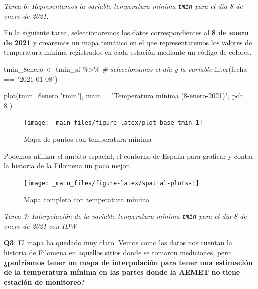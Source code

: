 \documentclass[
]{book}
\newenvironment{Shaded}{\begin{snugshade}}{\end{snugshade}}
\newcommand{\AttributeTok}[1]{\textcolor[rgb]{0.77,0.63,0.00}{#1}}
\newcommand{\CommentTok}[1]{\textcolor[rgb]{0.56,0.35,0.01}{\textit{#1}}}
\newcommand{\DecValTok}[1]{\textcolor[rgb]{0.00,0.00,0.81}{#1}}
\newcommand{\FunctionTok}[1]{\textcolor[rgb]{0.00,0.00,0.00}{#1}}
\newcommand{\NormalTok}[1]{#1}
\newcommand{\OtherTok}[1]{\textcolor[rgb]{0.56,0.35,0.01}{#1}}
\newcommand{\SpecialCharTok}[1]{\textcolor[rgb]{0.00,0.00,0.00}{#1}}
\newcommand{\StringTok}[1]{\textcolor[rgb]{0.31,0.60,0.02}{#1}}
\begin{document}
\emph{Tarea 6: Representamos la variable temperatura mínima \texttt{tmin} para el día 8 de
enero de 2021.}

En la siguiente tarea, seleccionaremos los datos correspondientes al \textbf{8 de
enero de 2021} y crearemos un mapa temático en el que representaremos los
valores de temperatura mínima registrados en cada estación mediante un código de
colores.

\begin{Shaded}
\begin{Highlighting}[]
\NormalTok{tmin\_8enero }\OtherTok{\textless{}{-}}\NormalTok{ tmin\_sf }\SpecialCharTok{\%\textgreater{}\%}
  \CommentTok{\# seleccionamos el día y la variable}
  \FunctionTok{filter}\NormalTok{(fecha }\SpecialCharTok{==} \StringTok{"2021{-}01{-}08"}\NormalTok{)}


\FunctionTok{plot}\NormalTok{(tmin\_8enero[}\StringTok{"tmin"}\NormalTok{],}
  \AttributeTok{main =} \StringTok{"Temperatura mínima (8{-}enero{-}2021)"}\NormalTok{,}
  \AttributeTok{pch =} \DecValTok{8}
\NormalTok{)}
\end{Highlighting}
\end{Shaded}

\begin{figure}

{\centering \texttt{[image: \_main\_files/figure-latex/plot-base-tmin-1]} 

}

\caption{Mapa de puntos con temperatura mínima}\label{fig:plot-base-tmin}
\end{figure}

Podemos utilizar el ámbito espacial, el contorno de España para graficar y
contar la historia de la Filomena un poco mejor.

\begin{figure}

{\centering \texttt{[image: \_main\_files/figure-latex/spatial-plots-1]} 

}

\caption{Mapa completo con temperatura mínima}\label{fig:spatial-plots}
\end{figure}

\emph{Tarea 7: Interpolación de la variable temperatura mínima \texttt{tmin} para el día 8
de enero de 2021 con IDW}

\textbf{Q3}: El mapa ha quedado muy claro. Vemos como los datos nos cuentan la
historia de Filomena en aquellos sitios donde se tomaron mediciones, pero
\textbf{¿podríamos tener un mapa de interpolación para tener una estimación de la
temperatura mínima en las partes donde la AEMET no tiene estación de
monitoreo?}
\end{document}
